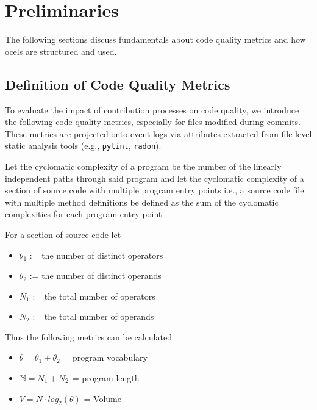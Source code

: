 \chapter{Preliminaries}\label{chap:prelim}
The following sections discuss fundamentals about code quality metrics and how \acp{ocel} are structured and used.

\section{Definition of Code Quality Metrics}\label{sec:code-quality-metrics}
To evaluate the impact of contribution processes on code quality, we introduce the following code quality metrics, especially for files modified during commits. These metrics are projected onto event logs via attributes extracted from file-level static analysis tools (e.g., \texttt{pylint}, \texttt{radon}).

\begin{definition}\label{def:cyclomatic-complexity}
Let the cyclomatic complexity of a program be the number of the linearly independent paths through said program and let the cyclomatic complexity of a section of source code with multiple program entry points i.e., a source code file with multiple method definitions be defined as the sum of the cyclomatic complexities for each program entry point
\end{definition}

\begin{definition}\label{def:halstead}
For a section of source code let
	\begin{itemize}
		\item $\theta_1$ := the number of distinct operators
		\item $\theta_2$ := the number of distinct operands
		\item $N_1$ := the total number of operators
		\item $N_2$ := the total number of operands
	\end{itemize}
Thus the following metrics can be calculated
	\begin{itemize}
		\item $\theta = \theta_1 + \theta_2$ = program vocabulary
		\item $\mathbb N = N_1 + N_2$ = program length
		\item $V = N \cdot log_2(\theta)$ = Volume 
	\end{itemize}
\end{definition}

